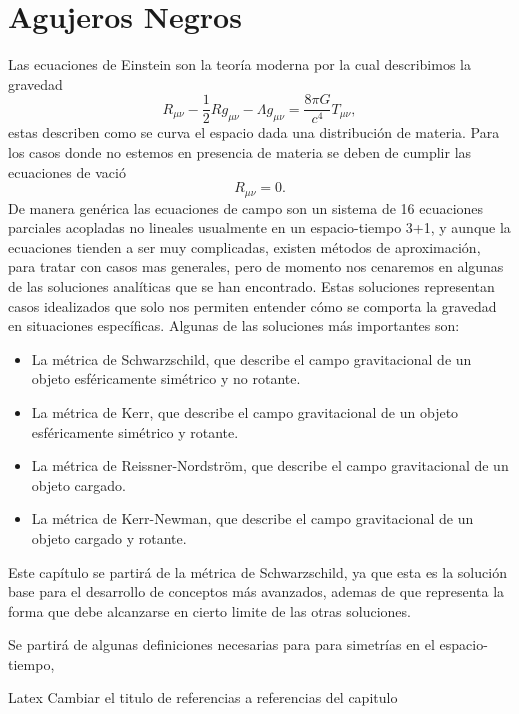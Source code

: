 \chapter{Agujeros Negros}

Las ecuaciones de Einstein son la teoría moderna por la cual describimos la gravedad
\begin{equation}
    R_{\mu \nu}-\frac{1}{2} R g_{\mu \nu}-\Lambda g_{\mu \nu} = \frac{8 \pi G}{c^4} T_{\mu \nu},
    \label{EinsteinFieldEquations}
\end{equation}
estas describen como se curva el espacio dada una distribución de materia. Para los casos donde no estemos en presencia de materia se deben de cumplir las ecuaciones de vació
\begin{equation}
    R_{\mu \nu} = 0.
    \label{vacuumFieldEquations}
\end{equation}
De manera genérica las ecuaciones de campo son un sistema de 16 ecuaciones parciales acopladas no lineales usualmente en un espacio-tiempo 3+1,  y aunque la ecuaciones tienden a ser muy complicadas, existen métodos de aproximación, para tratar con casos mas generales, pero de momento nos cenaremos en algunas de las  soluciones analíticas que se han encontrado. Estas soluciones representan casos idealizados que solo  nos permiten entender cómo se comporta la gravedad en situaciones específicas. Algunas de las soluciones más importantes son:

\begin{itemize}
    \item La métrica de Schwarzschild, que describe el campo gravitacional de un objeto esféricamente simétrico y no rotante.
    \item La métrica de Kerr, que describe el campo gravitacional de un objeto esféricamente simétrico y rotante.
    \item La métrica de Reissner-Nordström, que describe el campo gravitacional de un objeto cargado.
    \item La métrica de Kerr-Newman, que describe el campo gravitacional de un objeto cargado y rotante.
\end{itemize}
Este capítulo se partirá de la métrica de Schwarzschild, ya que esta es la solución base para el desarrollo de conceptos más avanzados, ademas de que representa la forma que debe alcanzarse en cierto limite de las otras soluciones.

Se partirá de algunas definiciones necesarias para  para simetrías en el espacio-tiempo,






\printbibliography[keyword={BlackHoles},heading=subbibliography]

\begin{task}{Latex}{}
    Cambiar el titulo de referencias a referencias del capitulo
\end{task}
\nocite{*}